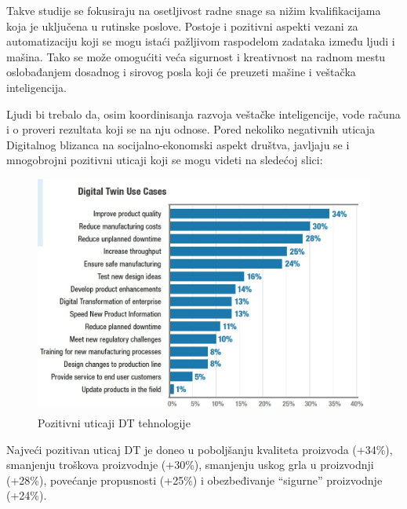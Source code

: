 \documentclass[a4paper]{article}
\begin{document}
{Takve studije se fokusiraju na osetljivost radne snage sa nižim kvalifikacijama koja je
uključena u rutinske poslove. Postoje i pozitivni aspekti vezani za automatizaciju koji se mogu
istaći pažljivom raspodelom zadataka između ljudi i mašina. Tako se može omogućiti veća
sigurnost i kreativnost na radnom mestu oslobađanjem dosadnog i sirovog posla koji će
preuzeti mašine i veštačka inteligencija. \cite{values}

Ljudi bi trebalo da, osim koordinisanja razvoja veštačke inteligencije, vode računa i o proveri
rezultata koji se na nju odnose. Pored nekoliko negativnih uticaja Digitalnog blizanca na socijalno-ekonomski aspekt društva, javljaju se i mnogobrojni pozitivni uticaji koji se mogu videti na
sledećoj slici: \cite{values}

\begin{figure}[h!]
	\begin{center}
		\includegraphics[scale=0.25]{6_usecases.jpg}
	\end{center}
	\caption{Pozitivni uticaji DT tehnologije\cite{usecases}}
\end{figure}

\newpage

Najveći pozitivan uticaj DT je doneo u poboljšanju kvaliteta proizvoda (+34\%),
smanjenju troškova proizvodnje (+30\%), smanjenju uskog grla u proizvodnji (+28\%), povećanje
propusnosti (+25\%) i obezbeđivanje “sigurne” proizvodnje (+24\%). \cite{values}\\

}
\end{document}
